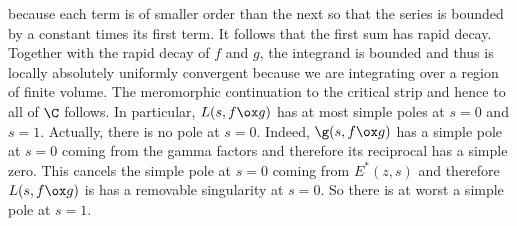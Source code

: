       because each term is of smaller order than the next so that the series is bounded by a constant times its first term. It follows that the first sum has rapid decay. Together with the rapid decay of $f$ and $g$, the integrand is bounded and thus is locally absolutely uniformly convergent because we are integrating over a region of finite volume. The meromorphic continuation to the critical strip and hence to all of $\C$ follows. In particular, $L(s,f \ox g)$ has at most simple poles at $s = 0$ and $s = 1$. Actually, there is no pole at $s = 0$. Indeed, $\g(s,f \ox g)$ has a simple pole at $s = 0$ coming from the gamma factors and therefore its reciprocal has a simple zero. This cancels the simple pole at $s = 0$ coming from $E^{\ast}(z,s)$ and therefore $L(s,f \ox g)$ is has a removable singularity at $s = 0$. So there is at worst a simple pole at $s = 1$.
